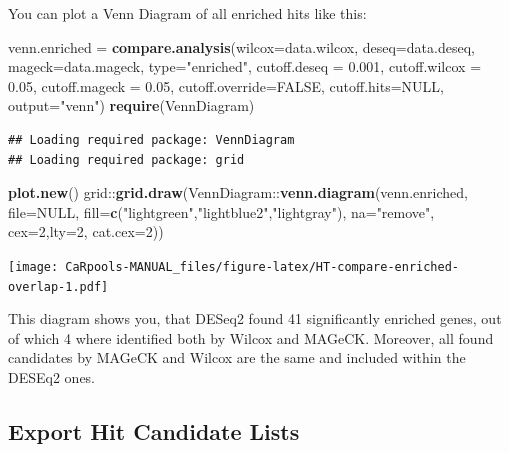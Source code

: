 \documentclass[]{article}
\newenvironment{Shaded}{\begin{snugshade}}{\end{snugshade}}
\newcommand{\KeywordTok}[1]{\textcolor[rgb]{0.13,0.29,0.53}{\textbf{{#1}}}}
\newcommand{\DataTypeTok}[1]{\textcolor[rgb]{0.13,0.29,0.53}{{#1}}}
\newcommand{\DecValTok}[1]{\textcolor[rgb]{0.00,0.00,0.81}{{#1}}}
\newcommand{\FloatTok}[1]{\textcolor[rgb]{0.00,0.00,0.81}{{#1}}}
\newcommand{\StringTok}[1]{\textcolor[rgb]{0.31,0.60,0.02}{{#1}}}
\newcommand{\OtherTok}[1]{\textcolor[rgb]{0.56,0.35,0.01}{{#1}}}
\newcommand{\NormalTok}[1]{{#1}}
\begin{document}
You can plot a Venn Diagram of all enriched hits like this:

\begin{Shaded}
\begin{Highlighting}[]
\NormalTok{venn.enriched =}\StringTok{ }\KeywordTok{compare.analysis}\NormalTok{(}\DataTypeTok{wilcox=}\NormalTok{data.wilcox, }\DataTypeTok{deseq=}\NormalTok{data.deseq, }\DataTypeTok{mageck=}\NormalTok{data.mageck, }\DataTypeTok{type=}\StringTok{"enriched"}\NormalTok{, }\DataTypeTok{cutoff.deseq =} \FloatTok{0.001}\NormalTok{, }\DataTypeTok{cutoff.wilcox =} \FloatTok{0.05}\NormalTok{, }\DataTypeTok{cutoff.mageck =} \FloatTok{0.05}\NormalTok{, }\DataTypeTok{cutoff.override=}\OtherTok{FALSE}\NormalTok{, }\DataTypeTok{cutoff.hits=}\OtherTok{NULL}\NormalTok{, }\DataTypeTok{output=}\StringTok{"venn"}\NormalTok{)}
\KeywordTok{require}\NormalTok{(VennDiagram)}
\end{Highlighting}
\end{Shaded}

\begin{verbatim}
## Loading required package: VennDiagram
## Loading required package: grid
\end{verbatim}

\begin{Shaded}
\begin{Highlighting}[]
\KeywordTok{plot.new}\NormalTok{()}
\NormalTok{grid::}\KeywordTok{grid.draw}\NormalTok{(VennDiagram::}\KeywordTok{venn.diagram}\NormalTok{(venn.enriched, }\DataTypeTok{file=}\OtherTok{NULL}\NormalTok{, }\DataTypeTok{fill=}\KeywordTok{c}\NormalTok{(}\StringTok{"lightgreen"}\NormalTok{,}\StringTok{"lightblue2"}\NormalTok{,}\StringTok{"lightgray"}\NormalTok{), }\DataTypeTok{na=}\StringTok{"remove"}\NormalTok{, }\DataTypeTok{cex=}\DecValTok{2}\NormalTok{,}\DataTypeTok{lty=}\DecValTok{2}\NormalTok{, }\DataTypeTok{cat.cex=}\DecValTok{2}\NormalTok{))}
\end{Highlighting}
\end{Shaded}

\texttt{[image: CaRpools-MANUAL\_files/figure-latex/HT-compare-enriched-overlap-1.pdf]}

This diagram shows you, that DESeq2 found 41 significantly enriched
genes, out of which 4 where identified both by Wilcox and MAGeCK.
Moreover, all found candidates by MAGeCK and Wilcox are the same and
included within the DESEq2 ones.

\newpage

\subsection{Export Hit Candidate
Lists}\label{export-hit-candidate-lists}
\end{document}
